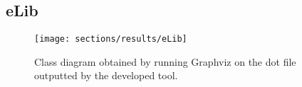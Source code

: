 \begin{appendices}
\section{eLib}\label{app:eLib}
\begin{figure}
\center
\texttt{[image: sections/results/eLib]}
\caption{Class diagram obtained by running Graphviz on the dot file outputted by the developed tool.}
\label{fig:eLib}
\end{figure}
\end{appendices}
